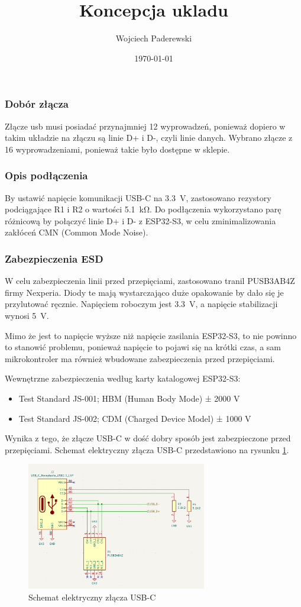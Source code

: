 \documentclass[../../main.tex]{subfiles}
\author{Wojciech Paderewski}
\date{\today}
\title{Koncepcja ukladu}
\begin{document}
\subsubsection{Dobór złącza}
Złącze usb musi posiadać przynajmniej 12 wyprowadzeń, ponieważ dopiero w takim układzie na złączu są linie D+ i D-, czyli linie danych.
Wybrano złącze z 16 wyprowadzeniami, ponieważ takie było dostępne w sklepie.
\subsubsection{Opis podłączenia}
By ustawić napięcie komunikacji USB-C na \SI{3.3}{\volt}, zastosowano rezystory podciągające R1 i R2 o wartości \SI{5.1}{\kilo\ohm}.
Do podłączenia wykorzystano parę różnicową by połączyć linie D+ i D- z ESP32-S3, w celu zminimalizowania zakłóceń CMN (Common Mode Noise).
\subsubsection{Zabezpieczenia ESD}
W celu zabezpieczenia linii przed przepięciami, zastosowano tranil PUSB3AB4Z firmy Nexperia. Diody te mają wystarczająco duże opakowanie by dało się je przylutować ręcznie. Napięciem roboczym jest \SI{3.3}{\volt},
a napięcie stabilizacji wynosi \SI{5}{\volt}.

Mimo że jest to napięcie wyższe niż napięcie zasilania ESP32-S3, to nie powinno to stanowić problemu, 
ponieważ napięcie to pojawi się na krótki czas, a sam mikrokontroler ma również wbudowane zabezpieczenia przed przepięciami.

Wewnętrzne zabezpieczenia według karty katalogowej ESP32-S3:
\begin{itemize}
    \item Test Standard JS-001; HBM (Human Body Mode) ± 2000 V
    \item Test Standard JS-002; CDM (Charged Device Model) ± 1000 V
\end{itemize}
Wynika z tego, że złącze USB-C w dość dobry sposób jest zabezpieczone przed przepięciami.
Schemat elektryczny złącza USB-C przedstawiono na rysunku \ref{fig:usb-c_schemat}.
\begin{figure}[H]
    \centering
    \includegraphics[width=0.7\textwidth]{usb-c_schemat.png}
    \caption{Schemat elektryczny złącza USB-C}
    \label{fig:usb-c_schemat}
\end{figure}
\end{document}
